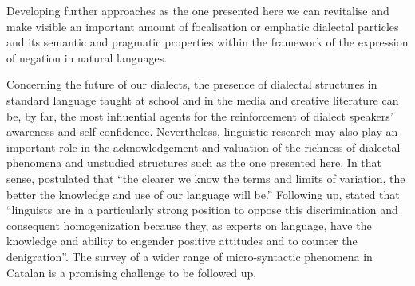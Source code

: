 \documentclass[output=paper]{LSP/langsci}
\begin{document}
Developing further approaches as the one presented here we can revitalise and make visible an important amount of focalisation or emphatic dialectal particles and its semantic and pragmatic properties within the framework of the expression of negation in natural languages.

Concerning the future of our dialects, the presence of dialectal structures in standard language taught at school and in the media and creative literature can be, by far, the most influential agents for the reinforcement of dialect speakers’ awareness and self-confidence. Nevertheless, linguistic research may also play an important role in the acknowledgement and valuation of the richness of dialectal phenomena and unstudied structures such as the one presented here. In that sense, \citet[80]{rigau_variacio_1998} postulated that “the clearer we know the terms and limits of variation, the better the knowledge and use of our language will be.”  Following up, \citet[31]{trudgill_sociolinguistic_2002} stated that “linguists are in a particularly strong position to oppose this discrimination and consequent homogenization because they, as experts on language, have the knowledge and ability to engender positive attitudes and to counter the denigration”. The survey of a wider range of micro-syntactic phenomena in Catalan is a promising challenge to be followed up.

\printbibliography[heading=subbibliography,notkeyword=this]
\end{document}
